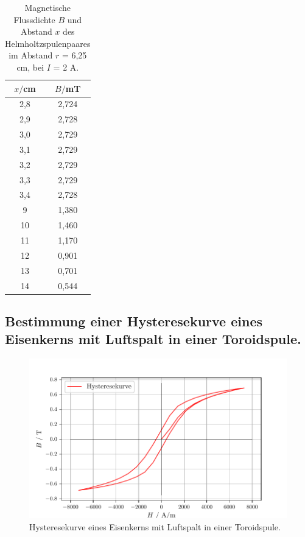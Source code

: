 \begin{table}[H]
  \centering
  \caption{Magnetische Flussdichte $B$  und Abstand $x$ des Helmholtzspulenpaares  im Abstand $r$ = 6,25 cm, bei $I$ = 2 A.}
  \begin{tabular}{c c}
    \toprule
     $x/$cm & $B/$mT  \\
    \midrule
    2,8 & 2,724 \\
    2,9 & 2,728 \\
    3,0 & 2,729 \\
    3,1 & 2,729 \\
    3,2 & 2,729 \\
    3,3 & 2,729 \\
    3,4 & 2,728 \\
    9 & 1,380\\
    10 & 1,460 \\
    11 & 1,170 \\
    12 & 0,901 \\
    13 & 0,701 \\
    14 & 0,544 \\

   
  \bottomrule
  \end{tabular}
\end{table}




\subsection{Bestimmung einer Hysteresekurve eines Eisenkerns mit Luftspalt in einer Toroidspule.}

\begin{figure}[H]
  \centering
  \includegraphics{plothyst.pdf}
  \caption{Hysteresekurve eines Eisenkerns mit Luftspalt in einer Toroidspule.}
  \label{fig:plot}
\end{figure}



